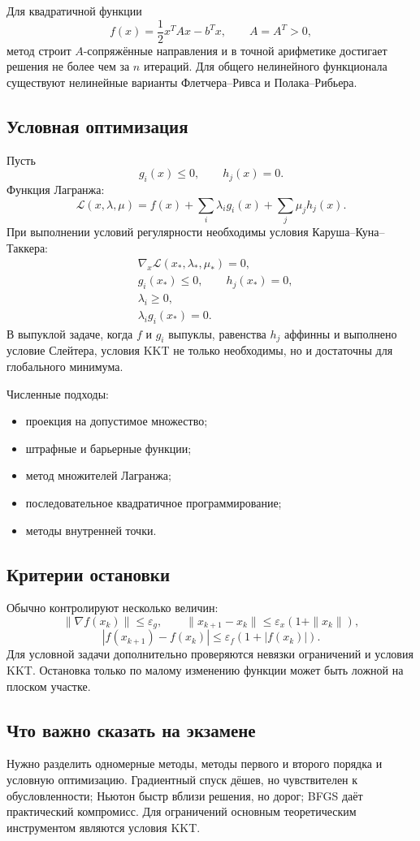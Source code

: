 Для квадратичной функции
\[
    f(x)=\frac12x^TAx-b^Tx,
    \qquad A=A^T>0,
\]
метод строит $A$-сопряжённые направления и в точной арифметике достигает решения
не более чем за $n$ итераций. Для общего нелинейного функционала существуют
нелинейные варианты Флетчера--Ривса и Полака--Рибьера.

\subsection{Условная оптимизация}

Пусть
\[
    g_i(x)\leq0,
    \qquad
    h_j(x)=0.
\]
Функция Лагранжа:
\[
    \mathcal L(x,\lambda,\mu)
    =f(x)+\sum_i\lambda_i g_i(x)+\sum_j\mu_j h_j(x).
\]
При выполнении условий регулярности необходимы условия Каруша--Куна--Таккера:
\[
\begin{aligned}
&\nabla_x\mathcal L(x_*,\lambda_*,\mu_*)=0,\\
&g_i(x_*)\leq0,\qquad h_j(x_*)=0,\\
&\lambda_i\geq0,\\
&\lambda_i g_i(x_*)=0.
\end{aligned}
\]
В выпуклой задаче, когда $f$ и $g_i$ выпуклы, равенства $h_j$ аффинны и
выполнено условие Слейтера, условия KKT не только необходимы, но и достаточны
для глобального минимума.

Численные подходы:
\begin{itemize}
    \item проекция на допустимое множество;
    \item штрафные и барьерные функции;
    \item метод множителей Лагранжа;
    \item последовательное квадратичное программирование;
    \item методы внутренней точки.
\end{itemize}

\subsection{Критерии остановки}

Обычно контролируют несколько величин:
\[
    \|\nabla f(x_k)\|\leq\varepsilon_g,
    \qquad
    \|x_{k+1}-x_k\|\leq\varepsilon_x(1+\|x_k\|),
\]
\[
    |f(x_{k+1})-f(x_k)|\leq\varepsilon_f(1+|f(x_k)|).
\]
Для условной задачи дополнительно проверяются невязки ограничений и условия KKT.
Остановка только по малому изменению функции может быть ложной на плоском участке.

\subsection{Что важно сказать на экзамене}

Нужно разделить одномерные методы, методы первого и второго порядка и условную
оптимизацию. Градиентный спуск дёшев, но чувствителен к обусловленности; Ньютон
быстр вблизи решения, но дорог; BFGS даёт практический компромисс. Для ограничений
основным теоретическим инструментом являются условия KKT.

\newpage